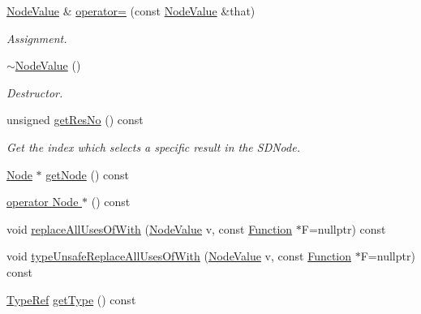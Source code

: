 \begin{DoxyCompactItemize}
\hyperlink{structglow_1_1_node_value}{Node\+Value} \& \hyperlink{structglow_1_1_node_value_af82cf14406121119e24e568fd25ee8ce}{operator=} (const \hyperlink{structglow_1_1_node_value}{Node\+Value} \&that)
\begin{DoxyCompactList}\small\item\em Assignment. \end{DoxyCompactList}\item 
\mbox{\label{structglow_1_1_node_value_aad7f9e771cd3a633b3f36c3a7c94d924}} 
\hyperlink{structglow_1_1_node_value_aad7f9e771cd3a633b3f36c3a7c94d924}{$\sim$\+Node\+Value} ()
\begin{DoxyCompactList}\small\item\em Destructor. \end{DoxyCompactList}\item 
\mbox{\label{structglow_1_1_node_value_aaddd5c84f5d64898659917b5062a711c}} 
unsigned \hyperlink{structglow_1_1_node_value_aaddd5c84f5d64898659917b5062a711c}{get\+Res\+No} () const
\begin{DoxyCompactList}\small\item\em Get the index which selects a specific result in the S\+D\+Node. \end{DoxyCompactList}\item 
\hyperlink{classglow_1_1_node}{Node} $\ast$ \hyperlink{structglow_1_1_node_value_a3b7a782893423f54d671b17d9dc61b3c}{get\+Node} () const
\item 
\hyperlink{structglow_1_1_node_value_a6c13650fac87ad2bde4d217b89b67cd0}{operator Node $\ast$} () const
\item 
void \hyperlink{structglow_1_1_node_value_a9817ddc27b8f7ce8627a3427bb93cc4c}{replace\+All\+Uses\+Of\+With} (\hyperlink{structglow_1_1_node_value}{Node\+Value} v, const \hyperlink{classglow_1_1_function}{Function} $\ast$F=nullptr) const
\item 
void \hyperlink{structglow_1_1_node_value_a189050953f05aa071d0ea42e0c96ca1d}{type\+Unsafe\+Replace\+All\+Uses\+Of\+With} (\hyperlink{structglow_1_1_node_value}{Node\+Value} v, const \hyperlink{classglow_1_1_function}{Function} $\ast$F=nullptr) const
\item 
\mbox{\label{structglow_1_1_node_value_a45452b6a56367075c07c09154fd1e6a2}} 
\hyperlink{structglow_1_1_type}{Type\+Ref} \hyperlink{structglow_1_1_node_value_a45452b6a56367075c07c09154fd1e6a2}{get\+Type} () const

\end{DoxyCompactItemize}
